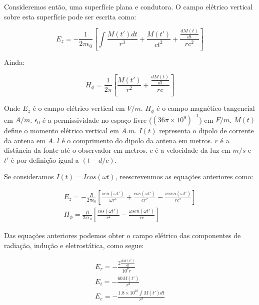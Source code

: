 \documentclass[a4paper, 12pt, onecolumn,singlespacing]{article}
\begin{document}
	Consideremos então, uma superfície plana e condutora. O campo elétrico vertical sobre esta superfície pode ser escrita	como:
	
	\begin{equation}
		E_z = -\frac{1}{2 \pi \epsilon_0} \left[\int \frac{M(t')dt}{r^3} + \frac{M(t')}{ct^2} + \frac{\frac{dM(t)}{dt}}{rc^2}\right] 
	\end{equation}
	
	Ainda:
	
	\begin{equation}
		H_\phi = \frac{1}{2 \pi} \left[ \frac{M(t')}{r^2} + \frac{\frac{dM(t)}{dt}}{rc}\right]
	\end{equation}
	
	Onde $E_z$ é o campo elétrico vertical em $V/m$. $H_\phi$ é o campo magnético tangencial em $A/m$. $\epsilon_0$ é a permissividade no espaço livre ($(36 \pi \times 10^9)^{-1}$) em $F/m$. $M(t)$ define o momento elétrico vertical em $A.m$. $I(t)$ representa o dipolo de corrente da antena em $A$. $l$ é o comprimento do dipolo da antena em metros. $r$ é a distância da fonte até o observador em metros. $c$ é a velocidade da luz em $m/s$ e $t'$ é por definição igual a $(t - d/c)$.
	
	Se consideramos $I(t) = I cos(\omega t)$, reescrevenmos as equações anteriores como:
	
	\begin{equation}
		\begin{split}
			E_z = -\frac{Il}{2 \pi \epsilon_0} \left[\frac{sen(\omega t')}{\omega r^3} + \frac{cos (\omega t')}{cr^2} - \frac{w sen(\omega t')}{rc^2}\right] \\
			H_\phi = \frac{Il}{2 \pi \epsilon_0} \left[ \frac{cos (\omega t')}{r^2} - \frac{\omega sen(\omega t')}{rc}\right]
		\end{split}
	\end{equation}
	
	Das equações anteriores podemos obter o campo elétrico das componentes de radiação, indução e eletrostática, como segue:
	
	\begin{equation}
		\begin{split}
			E_r = -\frac{2 \frac{dM(t')}{dt}}{10^7 r}\\
			E_i = -\frac{60 M(t')}{r^2}\\
			E_e = - \frac{1.8 \times 10^10 \int M(t')dt}{r^3}
		\end{split}
	\end{equation}
	
\end{document}
